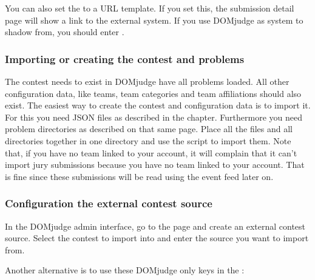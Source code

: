 \documentclass[a4paper,10pt,english,openany]{sphinxmanual}
\begin{document}
\sphinxAtStartPar
You can also set the  to a URL template. If you set
this, the submission detail page will show a link to the external system. If you
use DOMjudge as system to shadow from, you should enter
.


\subsubsection{Importing or creating the contest and problems}
\label{\detokenize{shadow:importing-or-creating-the-contest-and-problems}}
\sphinxAtStartPar
The contest needs to exist in DOMjudge  have all problems loaded. All other
configuration data, like teams, team categories and team affiliations should also
exist. The easiest way to create the contest and configuration data is to import
it. For this you need JSON files as described in the {\hyperref[\detokenize{import::doc}]{}} chapter.
Furthermore you need problem directories as described on that same page. Place
all the files and all directories together in one directory and use the
 script to import them. Note that, if you have no
team linked to your account, it will complain that it can’t import jury
submissions because you have no team linked to your account. That is fine since
these submissions will be read using the event feed later on.


\subsubsection{Configuration the external contest source}
\label{\detokenize{shadow:configuration-the-external-contest-source}}
\sphinxAtStartPar
In the DOMjudge admin interface, go to the  page and
create an external contest source. Select the contest to import into and enter
the source you want to import from.

\sphinxAtStartPar
Another alternative is to use these DOMjudge only keys in the :

\begin{sphinxVerbatim}[commandchars=\\\{\}]
   
   
   
   
\end{sphinxVerbatim}
\end{document}
